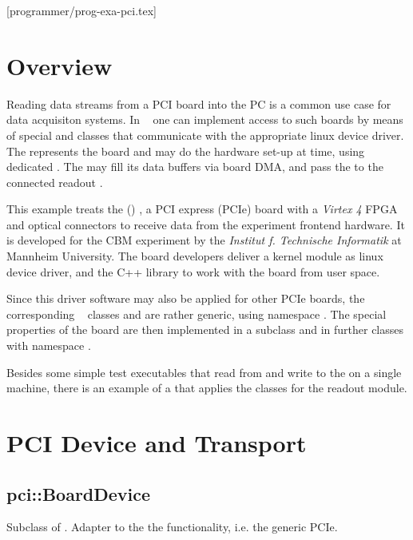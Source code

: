 [programmer/prog-exa-pci.tex]

\section{Overview}
Reading data streams from a PCI board into the PC is a common use case
for data acquisiton systems. In \dabc~ one can implement access to
such boards by means of special  and 
classes that communicate with the appropriate linux device driver.
The  represents the board and may do the hardware set-up 
at  time, using dedicated . 
The  may fill its data buffers via board DMA, and
pass the  to the connected readout . 

This example treats the
 (\ABB) \cite{AbbDescription}, 
a PCI express (PCIe) board with a {\em Virtex 4}
FPGA and optical connectors to receive data from the experiment frontend
hardware. It is developed for the CBM experiment \cite{CBM-stat-rep}
by the {\em Institut f. Technische Informatik} at Mannheim University. 
The board developers deliver a kernel module as linux device driver,
and the  C++ library to work with the board from user space.

Since this driver software may also be applied for other PCIe boards,
the corresponding \dabc~ classes  and 
are rather generic, using namespace .
The special properties of the \ABB board are then implemented in
a  subclass and in further classes with namespace
. 

Besides some simple test executables that read from and write to the 
\ABB on a single machine, there is an example of a 
that applies the \ABB classes for the readout module.    
 


\section{PCI Device and Transport}


\subsection{pci::BoardDevice}
Subclass of . Adapter to the the  functionality, i.e. the generic PCIe.

